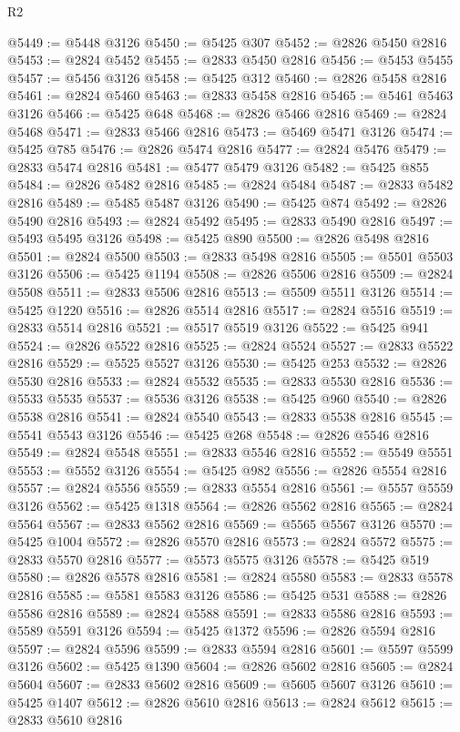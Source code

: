 \begin{lexlean}{R2}
\begin{coremodule}
@5449 := @5448 @3126
@5450 := @5425 @307
@5452 := @2826 @5450 @2816
@5453 := @2824 @5452
@5455 := @2833 @5450 @2816
@5456 := @5453 @5455
@5457 := @5456 @3126
@5458 := @5425 @312
@5460 := @2826 @5458 @2816
@5461 := @2824 @5460
@5463 := @2833 @5458 @2816
@5465 := @5461 @5463 @3126
@5466 := @5425 @648
@5468 := @2826 @5466 @2816
@5469 := @2824 @5468
@5471 := @2833 @5466 @2816
@5473 := @5469 @5471 @3126
@5474 := @5425 @785
@5476 := @2826 @5474 @2816
@5477 := @2824 @5476
@5479 := @2833 @5474 @2816
@5481 := @5477 @5479 @3126
@5482 := @5425 @855
@5484 := @2826 @5482 @2816
@5485 := @2824 @5484
@5487 := @2833 @5482 @2816
@5489 := @5485 @5487 @3126
@5490 := @5425 @874
@5492 := @2826 @5490 @2816
@5493 := @2824 @5492
@5495 := @2833 @5490 @2816
@5497 := @5493 @5495 @3126
@5498 := @5425 @890
@5500 := @2826 @5498 @2816
@5501 := @2824 @5500
@5503 := @2833 @5498 @2816
@5505 := @5501 @5503 @3126
@5506 := @5425 @1194
@5508 := @2826 @5506 @2816
@5509 := @2824 @5508
@5511 := @2833 @5506 @2816
@5513 := @5509 @5511 @3126
@5514 := @5425 @1220
@5516 := @2826 @5514 @2816
@5517 := @2824 @5516
@5519 := @2833 @5514 @2816
@5521 := @5517 @5519 @3126
@5522 := @5425 @941
@5524 := @2826 @5522 @2816
@5525 := @2824 @5524
@5527 := @2833 @5522 @2816
@5529 := @5525 @5527 @3126
@5530 := @5425 @253
@5532 := @2826 @5530 @2816
@5533 := @2824 @5532
@5535 := @2833 @5530 @2816
@5536 := @5533 @5535
@5537 := @5536 @3126
@5538 := @5425 @960
@5540 := @2826 @5538 @2816
@5541 := @2824 @5540
@5543 := @2833 @5538 @2816
@5545 := @5541 @5543 @3126
@5546 := @5425 @268
@5548 := @2826 @5546 @2816
@5549 := @2824 @5548
@5551 := @2833 @5546 @2816
@5552 := @5549 @5551
@5553 := @5552 @3126
@5554 := @5425 @982
@5556 := @2826 @5554 @2816
@5557 := @2824 @5556
@5559 := @2833 @5554 @2816
@5561 := @5557 @5559 @3126
@5562 := @5425 @1318
@5564 := @2826 @5562 @2816
@5565 := @2824 @5564
@5567 := @2833 @5562 @2816
@5569 := @5565 @5567 @3126
@5570 := @5425 @1004
@5572 := @2826 @5570 @2816
@5573 := @2824 @5572
@5575 := @2833 @5570 @2816
@5577 := @5573 @5575 @3126
@5578 := @5425 @519
@5580 := @2826 @5578 @2816
@5581 := @2824 @5580
@5583 := @2833 @5578 @2816
@5585 := @5581 @5583 @3126
@5586 := @5425 @531
@5588 := @2826 @5586 @2816
@5589 := @2824 @5588
@5591 := @2833 @5586 @2816
@5593 := @5589 @5591 @3126
@5594 := @5425 @1372
@5596 := @2826 @5594 @2816
@5597 := @2824 @5596
@5599 := @2833 @5594 @2816
@5601 := @5597 @5599 @3126
@5602 := @5425 @1390
@5604 := @2826 @5602 @2816
@5605 := @2824 @5604
@5607 := @2833 @5602 @2816
@5609 := @5605 @5607 @3126
@5610 := @5425 @1407
@5612 := @2826 @5610 @2816
@5613 := @2824 @5612
@5615 := @2833 @5610 @2816

\end{coremodule}
\end{lexlean}
